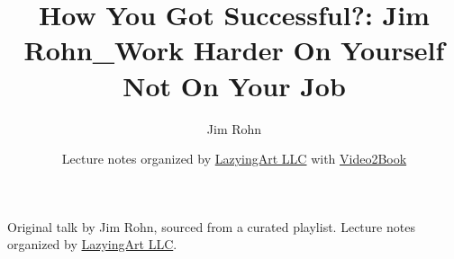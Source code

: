 \documentclass[11pt,oneside]{book}
\begin{document}
\frontmatter
\title{How You Got Successful?: Jim Rohn\_Work Harder On Yourself Not On Your Job}
\author{Jim Rohn}
\date{Lecture notes organized by \href{https://lazying.art}{LazyingArt LLC} with \href{https://github.com/lachlanchen/Video2Book}{Video2Book}}
\maketitle
\begin{center}
\small Original talk by Jim Rohn, sourced from a curated playlist. Lecture notes organized by \href{https://lazying.art}{LazyingArt LLC}.
\end{center}
\clearpage
\mainmatter

\end{document}
